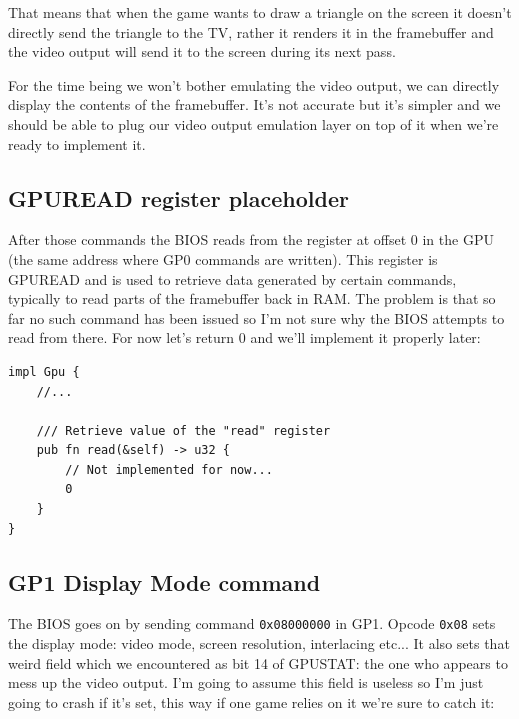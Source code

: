 \documentclass[a4paper]{article}
\newcommand{\code}[1] {\texttt{#1}}
\begin{document}
That means that when the game wants to draw a triangle on the screen
it doesn't directly send the triangle to the TV, rather it renders it
in the framebuffer and the video output will send it to the screen
during its next pass.

For the time being we won't bother emulating the video output, we can
directly display the contents of the framebuffer. It's not accurate
but it's simpler and we should be able to plug our video output
emulation layer on top of it when we're ready to implement it.

\subsection{GPUREAD register placeholder}

After those commands the BIOS reads from the register at offset 0 in
the GPU (the same address where GP0 commands are written). This
register is GPUREAD and is used to retrieve data generated by certain
commands, typically to read parts of the framebuffer back in RAM. The
problem is that so far no such command has been issued so I'm not sure
why the BIOS attempts to read from there. For now let's return 0 and
we'll implement it properly later:

\begin{lstlisting}
impl Gpu {
    //...

    /// Retrieve value of the "read" register
    pub fn read(&self) -> u32 {
        // Not implemented for now...
        0
    }
}
\end{lstlisting}

\subsection{GP1 Display Mode command}

The BIOS goes on by sending command \code{0x08000000} in GP1. Opcode
\code{0x08} sets the display mode: video mode, screen resolution,
interlacing etc... It also sets that weird field which we encountered
as bit 14 of GPUSTAT: the one who appears to mess up the video
output. I'm going to assume this field is useless so I'm just going to
crash if it's set, this way if one game relies on it we're sure to
catch it:
\end{document}
